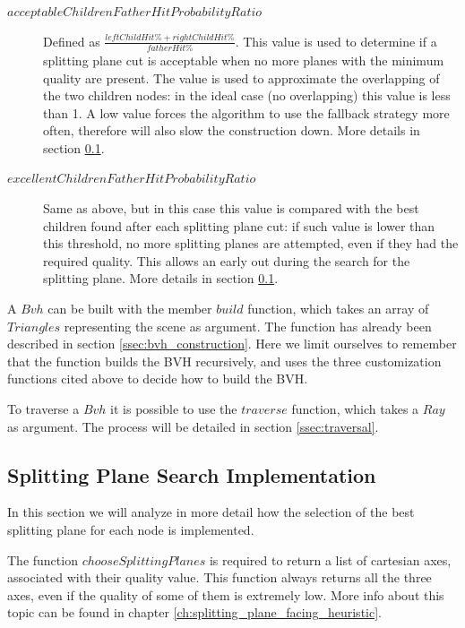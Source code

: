 \documentclass{PoliMi_MasterThesis}
\begin{document}
\begin{description}
	\item[\boldmath$acceptableChildrenFatherHitProbabilityRatio$] Defined as $\frac{leftChildHit\% + rightChildHit\%}{fatherHit\%}$. This value is used to determine if a splitting plane cut is acceptable when no more planes with the minimum quality are present. The value is used to approximate the overlapping of the two children nodes: in the ideal case (no overlapping) this value is less than 1. A low value forces the algorithm to use the fallback strategy more often, therefore will also slow the construction down. More details in section \ref{ssec:splitting_plane_implementation}.
	\item[\boldmath$excellentChildrenFatherHitProbabilityRatio$] Same as above, but in this case this value is compared with the best children found after each splitting plane cut: if such value is lower than this threshold, no more splitting planes are attempted, even if they had the required quality. This allows an early out during the search for the splitting plane. More details in section \ref{ssec:splitting_plane_implementation}.
\end{description}
	
A $Bvh$ can be built with the member $build$ function, which takes an array of $Triangles$ representing the scene as argument. The function has already been described in section \ref{ssec:bvh_construction}. Here we limit ourselves to remember that the function builds the BVH recursively, and uses the three customization functions cited above to decide how to build the BVH.

To traverse a $Bvh$ it is possible to use the $traverse$ function, which takes a $Ray$ as argument. The process will be detailed in section \ref{ssec:traversal}.


\subsection{Splitting Plane Search Implementation} \label{ssec:splitting_plane_implementation}
In this section we will analyze in more detail how the selection of the best splitting plane for each node is implemented.

The function $chooseSplittingPlanes$ is required to return a list of cartesian axes, associated with their quality value. This function always returns all the three axes, even if the quality of some of them is extremely low. More info about this topic can be found in chapter \ref{ch:splitting_plane_facing_heuristic}.
\end{document}
